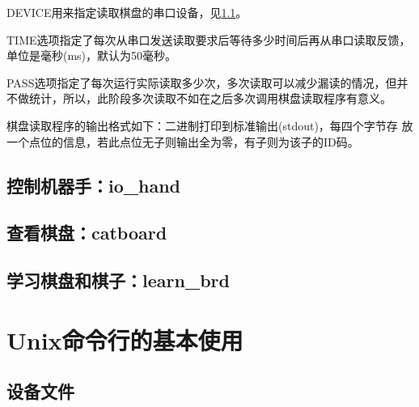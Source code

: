 \documentclass[a4paper]{article}
\begin{document}
DEVICE用来指定读取棋盘的串口设备，见\ref{dev}。

TIME选项指定了每次从串口发送读取要求后等待多少时间后再从串口读取反馈，
单位是毫秒(ms)，默认为50毫秒。

PASS选项指定了每次运行实际读取多少次，多次读取可以减少漏读的情况，但并
不做统计，所以，此阶段多次读取不如在之后多次调用棋盘读取程序有意义。

棋盘读取程序的输出格式如下：二进制打印到标准输出(stdout)，每四个字节存
放一个点位的信息，若此点位无子则输出全为零，有子则为该子的ID码。

\subsection{控制机器手：io\_hand}


\subsection{查看棋盘：catboard}
\subsection{学习棋盘和棋子：learn\_brd}















\clearpage
\appendix
\section{Unix命令行的基本使用}
\label{app1}
\subsection{设备文件}
\label{dev}
\end{document}
